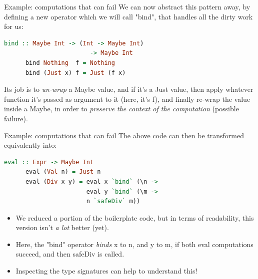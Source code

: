 \documentclass{beamer}
\begin{document}
\begin{frame}[fragile]{Example: computations that can fail}
    We can now abstract this pattern away, by defining a new operator
    which we will call "bind", that handles all the dirty work for us:

    \begin{minipage}{\linewidth} \hspace{1cm}
    \begin{lstlisting}[language=haskell, numbers=none, frame=none]
      bind :: Maybe Int -> (Int -> Maybe Int)
                        -> Maybe Int
      bind Nothing  f = Nothing
      bind (Just x) f = Just (f x)
    \end{lstlisting}
    \end{minipage} \hspace{1cm}

    Its job is to \textit{un-wrap} a Maybe value, and if it's a Just value,
    then apply whatever function it's passed as argument to it
    (here, it's f), and finally re-wrap the value inside a Maybe, in order
    to \textit{preserve the context of the computation} (possible failure).
\end{frame}

\begin{frame}[fragile]{Example: computations that can fail}
    The above code can then be transformed equivalently into:

    \begin{minipage}{\linewidth} \hspace{1cm}
    \begin{lstlisting}[language=haskell, numbers=none, frame=none]
      eval :: Expr -> Maybe Int
      eval (Val n) = Just n
      eval (Div x y) = eval x `bind` (\n ->
                       eval y `bind` (\m ->
                       n `safeDiv` m))
    \end{lstlisting}
    \end{minipage} \hspace{1cm}

    \begin{itemize}
        \item We reduced a portion of the boilerplate code, but in terms of
              readability, this version isn't \textit{a lot} better (yet).
        \item Here, the "bind" operator \textit{binds} x to n, and y
              to m, if both eval computations succeed, and then safeDiv
              is called.
        \item Inspecting the type signatures can help to understand this!
    \end{itemize}
\end{frame}
\end{document}
